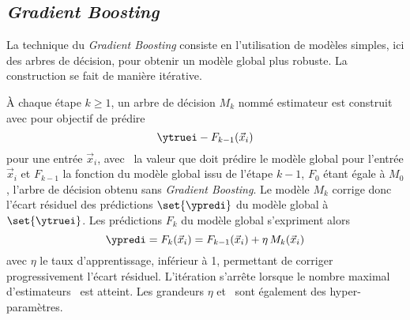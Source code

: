 \subsection{\emph{Gradient Boosting}}
La technique du \emph{Gradient Boosting} consiste en
l'utilisation de modèles simples,
ici des arbres de décision,
pour obtenir un modèle global plus robuste.
La construction se fait de manière itérative.
\par
À chaque étape $k\geq1$,
un arbre de décision $M_k$ nommé estimateur est construit avec pour objectif de prédire
\begin{equation}
\ytruei - F_{k-1}(\vec{x}_i)
\end{equation}
pour une entrée $\vec{x}_i$,
avec
\ytruei\ la valeur que doit prédire le modèle global pour l'entrée $\vec{x}_i$
et
$F_{k-1}$ la fonction du modèle global issu de l'étape ${k-1}$,
$F_0$ étant égale à $M_0$, l'arbre de décision obtenu sans \emph{Gradient Boosting}.
Le modèle $M_k$ corrige donc l'écart résiduel des prédictions $\set{\ypredi}$ du modèle global à $\set{\ytruei}$.
Les prédictions $F_k$ du modèle global s'expriment alors
\begin{equation}
\ypredi = F_k(\vec{x}_i) = F_{k-1}(\vec{x}_i) + \eta\,M_k(\vec{x}_i)
\end{equation}
avec
$\eta$ le taux d'apprentissage, inférieur à 1, permettant de corriger progressivement l'écart résiduel.
L'itération s'arrête lorsque le nombre maximal d'estimateurs \Nestimators\ est atteint.
Les grandeurs $\eta$ et \Nestimators\ sont également des hyper-paramètres.
